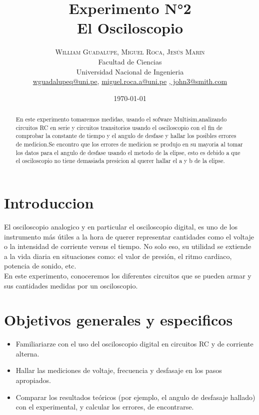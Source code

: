 \documentclass[twoside,twocolumn]{article}
\title{Experimento N°2\\El Osciloscopio}
\author{
\textsc{William Guadalupe}\textsc{, Miguel Roca}\textsc{, Jesús Marin}\\
\normalsize Facultad de Ciencias \\ 
\normalsize Universidad Nacional de Ingenieria \\ 
\normalsize \href{mailto:wguadalupeq@uni.pe}{wguadalupeq@uni.pe},  \href{mailto:miguel.roca.a@uni.pe}{miguel.roca.a@uni.pe} \href{mailto:john@smith.com}{,  john3@smith.com} 
}
\date{\today}
\begin{document}
\maketitle

\begin{abstract}

En este experimento tomaremos medidas, usando
el sofware Multisim,analizando circuitos RC en serie y circuitos transitorios usando el osciloscopio con el fin de comprobar la constante de tiempo y el angulo de desfase y hallar los posibles errores de medicion.Se encontro que los errores de medicion se produjo en su mayoria al tomar los datos para el angulo de desfase usando el metodo de la elipse, esto es debido a que el osciloscopio no tiene demasiada presicion al querer hallar el a y b de la elipse.

\end{abstract}

\section{Introduccion}
El osciloscopio analogico y en particular el osciloscopio digital, es uno de los instrumento más útiles a la hora de querer representar cantidades como el voltaje o la intensidad de corriente versus el tiempo. No solo eso, su utilidad se extiende a la vida diaria en situaciones como: el valor de presión, el ritmo cardiaco, potencia de sonido, etc.\\
En este experimento, conoceremos los diferentes circuitos que se pueden armar y sus cantidades medidas por un osciloscopio.

\section{Objetivos generales y especificos}
\begin{itemize}
\item Familiariarze con el uso del osciloscopio digital en circuitos RC y de corriente alterna.
\item Hallar las mediciones de voltaje, frecuencia y desfasaje en los pasos apropiados.
\item Comparar los resultados teóricos (por ejemplo, el angulo de desfasaje hallado) con el experimental, y calcular los errores, de encontrarse.
\end{itemize}
\newpage
\end{document}
